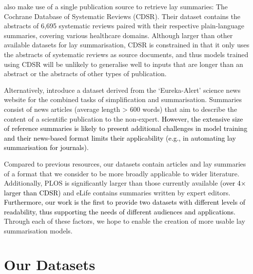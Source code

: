 \documentclass[11pt]{article}
\begin{document}
\citet{Guo2020-ba} also make use of a single publication source to retrieve lay summaries: The Cochrane Database of Systematic Reviews (\textsc{CDSR}). Their dataset contains the abstracts of 6,695 systematic reviews paired with their respective plain-language summaries, covering various healthcare domains.
Although larger than other available datasets for lay summarisation, \textsc{CDSR} is constrained in that it only uses the abstracts of systematic reviews as source documents, and thus models trained using \textsc{CDSR} will be unlikely to generalise well to inputs that are longer than an abstract or the abstracts of other types of publication.



Alternatively, \citet{Zaman2020-kx} introduce a dataset derived from the `Eureka-Alert' science news website for the combined tasks of simplification and summarisation. Summaries consist of news articles (average length > 600 words) that aim to describe the content of a scientific publication to the non-expert. 
\textcolor{black}{However, the extensive size of reference summaries is likely to present additional challenges in model training and their news-based format limits their applicability (e.g., in automating lay summarisation for journals).}

Compared to previous resources, our datasets contain articles and lay summaries of a format that we consider to be more broadly applicable to wider literature. Additionally, PLOS is significantly larger than those currently available \textcolor{black}{(over 4$\times$ larger than CDSR)} and eLife contains summaries written by expert editors. 
\textcolor{black}{Furthermore, our work is the first to provide two datasets with different levels of readability, thus supporting the needs of different audiences and applications.}
Through each of these factors, we hope to enable the creation of more usable lay summarisation models.












%
 





\section{Our Datasets} \label{sec:our-datasets}
\end{document}

